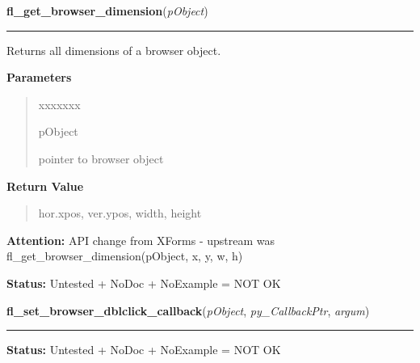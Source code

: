 \hspace{.8\funcindent}\begin{boxedminipage}{\funcwidth}

    \raggedright \textbf{fl\_get\_browser\_dimension}(\textit{pObject})

    \vspace{-1.5ex}

    \rule{\textwidth}{0.5\fboxrule}
\setlength{\parskip}{2ex}
    Returns all dimensions of a browser object.

\setlength{\parskip}{1ex}
      \textbf{Parameters}
      \vspace{-1ex}

      \begin{quote}
        \begin{Ventry}{xxxxxxx}

          \item[pObject]

          pointer to browser object

        \end{Ventry}

      \end{quote}

      \textbf{Return Value}
    \vspace{-1ex}

      \begin{quote}
      hor.xpos, ver.ypos, width, height

      \end{quote}

\textbf{Attention:} API change from XForms - upstream was fl\_get\_browser\_dimension(pObject, 
x, y, w, h)



\textbf{Status:} Untested + NoDoc + NoExample = NOT OK



    \end{boxedminipage}

    \label{xformslib:library:fl_set_browser_dblclick_callback}

    \vspace{0.5ex}

\hspace{.8\funcindent}\begin{boxedminipage}{\funcwidth}

    \raggedright \textbf{fl\_set\_browser\_dblclick\_callback}(\textit{pObject}, \textit{py\_CallbackPtr}, \textit{argum})

    \vspace{-1.5ex}

    \rule{\textwidth}{0.5\fboxrule}
\setlength{\parskip}{2ex}
\setlength{\parskip}{1ex}
\textbf{Status:} Untested + NoDoc + NoExample = NOT OK



    \end{boxedminipage}

